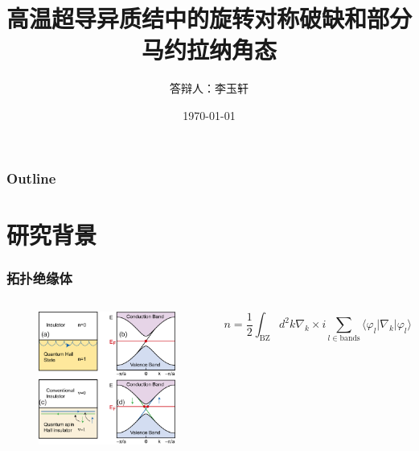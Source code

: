 \documentclass[10pt,aspectratio=169]{beamer} %
\title{高温超导异质结中的旋转对称破缺和部分马约拉纳角态}
\subtitle{}   %
\author[YuXuan Li]{答辩人：李玉轩}
\institute[South China Normal University]{\large 专业：凝聚态物理\\指导老师：周涛\quad 教授}
\date{\today}
\begin{document}
\maketitle
\begin{frame}%
\frametitle{Outline}%
\textbf{\tableofcontents} %
\end{frame}
\section{研究背景}
\begin{frame}
\frametitle{拓扑绝缘体}
\begin{columns}
\begin{figure}[h]
\flushleft
\includegraphics[scale=0.4]{pic/fig1.png}
\end{figure}
\bigskip
{}
\begin{equation}	
	n=\frac{1}{2}\int_{\mathrm{BZ}}d^2k\nabla_k\times i\sum_{l\in\mathrm{bands}}\langle\varphi_l|\nabla_k|\varphi_l\rangle\label{chern_num}
\end{equation}
\end{columns}
\end{frame}
\end{document}
